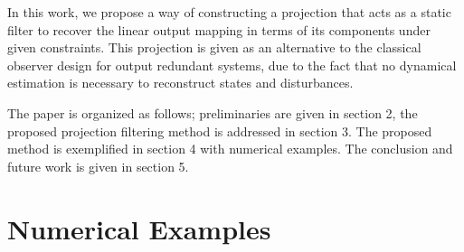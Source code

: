 \documentclass[pdflatex,sn-mathphys-num]{sn-jnl}%
\theoremstyle{thmstyleone}%
\theoremstyle{thmstyletwo}%
\theoremstyle{thmstylethree}%
\begin{document}
In this work, we propose a way of constructing a projection that acts as a static filter to recover the linear output mapping in terms of its components under given constraints. This projection is given as an alternative to the classical observer design for output redundant systems, due to the fact that no dynamical estimation is necessary to reconstruct states and disturbances. 

The paper is organized as follows; preliminaries are given in section 2, the proposed projection filtering method is addressed in section 3. The proposed method is exemplified in section 4 with numerical examples. The conclusion and future work is given in section 5.


\section{Numerical Examples}






% 
         
\end{document}
